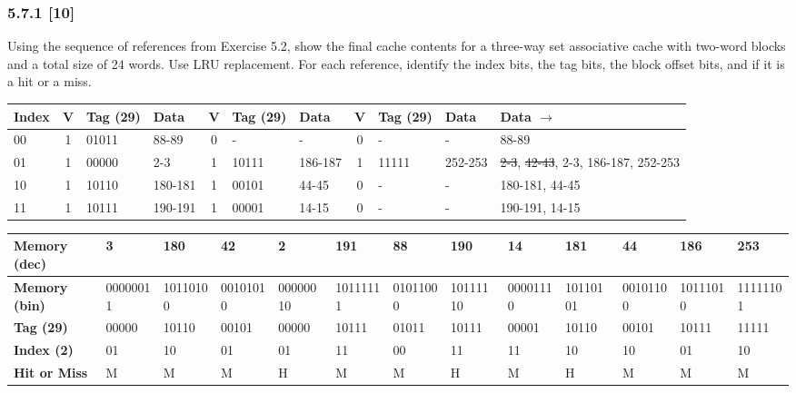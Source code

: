 \documentclass[fleqn]{article}
\begin{document}
\subsubsection*{5.7.1 [10] \textrangle} Using the sequence of references from Exercise 5.2, show the final cache contents for a three-way set associative cache with two-word blocks and a total size of 24 words. Use LRU replacement. For each reference, identify the index bits, the tag bits, the block offset bits, and if it is a hit or a miss.
\begin{table}[H]
    \setlength{\tabcolsep}{3pt}
    \fontsize{6pt}{12pt}\selectfont
    \begin{tabular}{l|c|l|l|c|l|l|c|l|l||l}
    \textbf{Index} & \multicolumn{1}{l|}{\textbf{V}} & \textbf{Tag (29)} & \textbf{Data} & \multicolumn{1}{l|}{\textbf{V}} & \textbf{Tag (29)} & \textbf{Data} & \multicolumn{1}{l|}{\textbf{V}} & \textbf{Tag (29)} & \textbf{Data} & \textbf{Data $\rightarrow$} \\ \hline
    00 & 1 & 01011 & 88-89 & 0 & - & - & 0 & - & - & 88-89 \\
    01 & 1 & 00000 & 2-3 & 1 & 10111 & 186-187 & 1 & 11111 & 252-253 & \multicolumn{1}{r}{ \st{2-3}, \st{42-43}, 2-3, 186-187, 252-253} \\
    10 & 1 & 10110 & 180-181 & 1 & 00101 & 44-45 & 0 & - & - & 180-181, 44-45 \\
    11 & 1 & 10111 & 190-191 & 1 & 00001 & 14-15 & 0 & - & - & 190-191, 14-15 \\
    \end{tabular}
\end{table}

\begin{table}[H]
    \setlength{\tabcolsep}{3pt}
    \fontsize{6pt}{12pt}\selectfont
    \begin{tabular}{l|l|l|l|l|l|l|l|l|l|l|l|l}
    \textbf{Memory (dec)} & \textbf{3} & \textbf{180} & \textbf{42} & \textbf{2} & \textbf{191} & \textbf{88} & \textbf{190} & \textbf{14} & \textbf{181} & \textbf{44} & \textbf{186} & \textbf{253} \\ \hline
    \textbf{Memory (bin)} & 00000011 & 10110100 & 00101010 & 00000010 & 10111111 & 01011000 & 10111110 & 00001110 & 10110101 & 00101100 & 10111010 & 11111101 \\
    \textbf{Tag (29)} & 00000 & 10110 & 00101 & 00000 & 10111 & 01011 & 10111 & 00001 & 10110 & 00101 & 10111 & 11111 \\
    \textbf{Index (2)} & 01 & 10 & 01 & 01 & 11 & 00 & 11 & 11 & 10 & 10 & 01 & 10 \\
    \textbf{Hit or Miss} & M & M & M & H & M & M & H & M & H & M & M & M
    \end{tabular}
\end{table}
\end{document}
